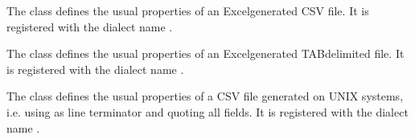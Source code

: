 \documentclass[letterpaper,10pt,english]{sphinxmanual}
\begin{document}

\begin{fulllineitems}
\label{\detokenize{csv:csv.excel}}
The {\hyperref[\detokenize{csv:csv.excel}]{}} class defines the usual properties of an Excel\sphinxhyphen{}generated CSV
file.  It is registered with the dialect name .

\end{fulllineitems}


\begin{fulllineitems}
\label{\detokenize{csv:csv.excel_tab}}
The {\hyperref[\detokenize{csv:csv.excel_tab}]{}} class defines the usual properties of an Excel\sphinxhyphen{}generated
TAB\sphinxhyphen{}delimited file.  It is registered with the dialect name .

\end{fulllineitems}


\begin{fulllineitems}
\label{\detokenize{csv:csv.unix_dialect}}
The {\hyperref[\detokenize{csv:csv.unix_dialect}]{}} class defines the usual properties of a CSV file
generated on UNIX systems, i.e. using  as line terminator and quoting
all fields.  It is registered with the dialect name .


\end{fulllineitems}
\end{document}
